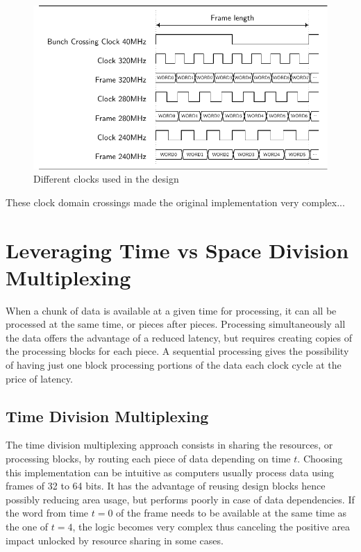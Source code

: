 \begin{figure}[htb]
    \centering
    \includegraphics{timings/bc_clocks}
    \caption{Different clocks used in the design}
    \label{fig:bc-clocks}
\end{figure}

These clock domain crossings made the original implementation very complex...

\section{Leveraging Time vs Space Division Multiplexing}\label{sec:leveraging-time-division-multiplexing}

When a chunk of data is available at a given time for processing, it can all be processed at the same time, or pieces after pieces.
Processing simultaneously all the data offers the advantage of a reduced latency, but requires creating copies of the processing blocks for each piece. A sequential processing gives the possibility of having just one block processing portions of the data each clock cycle at the price of latency.

\subsection{Time Division Multiplexing}\label{sec:time-division-multiplexing}
The time division multiplexing approach consists in sharing the resources, or processing blocks, by routing each piece of data depending on time \(t\). Choosing this implementation can be intuitive as computers usually process data using frames of 32 to 64 bits. It has the advantage of reusing design blocks hence possibly reducing area usage, but performs poorly in case of data dependencies. If the word from time \(t=0\) of the frame needs to be available at the same time as the one of \(t=4\), the logic becomes very complex thus canceling the positive area impact unlocked by resource sharing in some cases.

